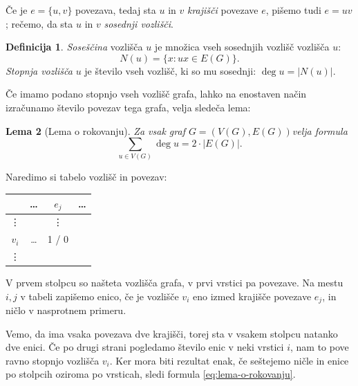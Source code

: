 \documentclass[12pt,a4paper]{amsart}
\theoremstyle{definition} %
\newtheorem{definicija}{Definicija}[section]
\theoremstyle{plain} %
\newtheorem{lema}[definicija]{Lema}
\newcommand{\graf}[1][G]{\ensuremath{#1 = (V(#1), E(#1))}}
\newcommand{\povezave}[1][G]{\ensuremath{E(#1)}}
\DeclareMathOperator {\stopnja} {deg}
\begin{document}
Če je $e = \{ u,v \}$ povezava, tedaj sta $u$ in $v$ \emph{krajišči} povezave $e$, pišemo tudi $e = uv$; rečemo, da sta $u$ in $v$ \emph{sosednji vozlišči}.

\begin{definicija}
	\emph{Soseščina} vozlišča $u$ je množica vseh sosednjih vozlišč vozlišča $u$:
	\[ N(u) = \{ x\colon ux \in \povezave \} .\]
	\emph{Stopnja vozlišča} $u$ je število vseh vozlišč, ki so mu sosednji: $\stopnja u = |N(u)|$.
\end{definicija}

Če imamo podano stopnjo vseh vozlišč grafa, lahko na enostaven način izračunamo število povezav tega grafa, velja sledeča lema:

\begin{lema}[Lema o rokovanju]
    \label{lema:rokovanje}
    Za vsak graf \graf velja formula
    \begin{equation}
        \sum_{u \in V(G)}\! \stopnja u = 2 \cdot |E(G)|.
        \label{eq:lema-o-rokovanju}
    \end{equation}
\end{lema}

\proof
    Naredimo si tabelo vozlišč in povezav:
    
    \begin{table}[h]
        \centering
        \begin{tabular}{c|ccc}
            & \ldots & $e_j$ & \ldots \\ \hline
            \vdots & & \vdots & \\
            $v_i$ & \ldots & 1 / 0 & \\
            \vdots & & &
        \end{tabular}
    \end{table}
    
    V prvem stolpcu so našteta vozlišča grafa, v prvi vrstici pa povezave. Na mestu $i,j$ v tabeli zapišemo enico, če je vozlišče $v_i$ eno izmed krajišče povezave $e_j$, in ničlo v nasprotnem primeru. 
    
    Vemo, da ima vsaka povezava dve krajišči, torej sta v vsakem stolpcu natanko dve enici. Če po drugi strani pogledamo število enic v neki vrstici $i$, nam to pove ravno stopnjo vozlišča $v_i$. Ker mora biti rezultat enak, če seštejemo ničle in enice po stolpcih oziroma po vrsticah, sledi formula \eqref{eq:lema-o-rokovanju}.
\endproof
\end{document}
